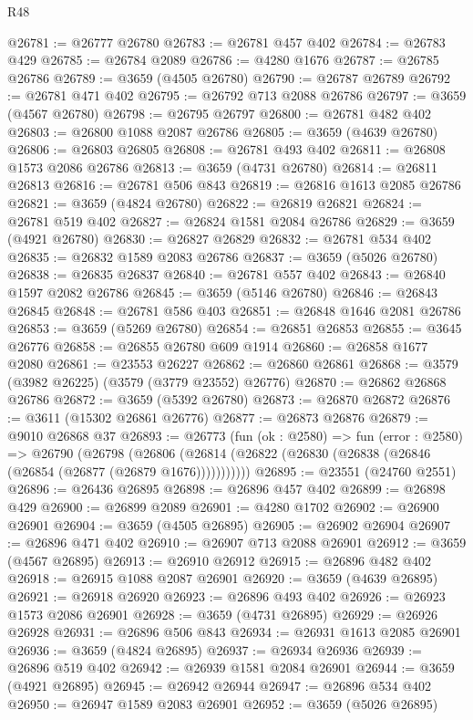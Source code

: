 \begin{lexlean}{R48}
\begin{coremodule}
@26781 := @26777 @26780
@26783 := @26781 @457 @402
@26784 := @26783 @429
@26785 := @26784 @2089
@26786 := @4280 @1676
@26787 := @26785 @26786
@26789 := @3659 (@4505 @26780)
@26790 := @26787 @26789
@26792 := @26781 @471 @402
@26795 := @26792 @713 @2088 @26786
@26797 := @3659 (@4567 @26780)
@26798 := @26795 @26797
@26800 := @26781 @482 @402
@26803 := @26800 @1088 @2087 @26786
@26805 := @3659 (@4639 @26780)
@26806 := @26803 @26805
@26808 := @26781 @493 @402
@26811 := @26808 @1573 @2086 @26786
@26813 := @3659 (@4731 @26780)
@26814 := @26811 @26813
@26816 := @26781 @506 @843
@26819 := @26816 @1613 @2085 @26786
@26821 := @3659 (@4824 @26780)
@26822 := @26819 @26821
@26824 := @26781 @519 @402
@26827 := @26824 @1581 @2084 @26786
@26829 := @3659 (@4921 @26780)
@26830 := @26827 @26829
@26832 := @26781 @534 @402
@26835 := @26832 @1589 @2083 @26786
@26837 := @3659 (@5026 @26780)
@26838 := @26835 @26837
@26840 := @26781 @557 @402
@26843 := @26840 @1597 @2082 @26786
@26845 := @3659 (@5146 @26780)
@26846 := @26843 @26845
@26848 := @26781 @586 @403
@26851 := @26848 @1646 @2081 @26786
@26853 := @3659 (@5269 @26780)
@26854 := @26851 @26853
@26855 := @3645 @26776
@26858 := @26855 @26780 @609 @1914
@26860 := @26858 @1677 @2080
@26861 := @23553 @26227
@26862 := @26860 @26861
@26868 := @3579 (@3982 @26225) (@3579 (@3779 @23552) @26776)
@26870 := @26862 @26868 @26786
@26872 := @3659 (@5392 @26780)
@26873 := @26870 @26872
@26876 := @3611 (@15302 @26861 @26776)
@26877 := @26873 @26876
@26879 := @9010 @26868 @37
@26893 := @26773
    (fun (ok : @2580) =>
    fun (error : @2580) =>
    @26790
      (@26798
        (@26806 (@26814 (@26822 (@26830 (@26838 (@26846 (@26854 (@26877 (@26879 @1676)))))))))))
@26895 := @23551 (@24760 @2551)
@26896 := @26436 @26895
@26898 := @26896 @457 @402
@26899 := @26898 @429
@26900 := @26899 @2089
@26901 := @4280 @1702
@26902 := @26900 @26901
@26904 := @3659 (@4505 @26895)
@26905 := @26902 @26904
@26907 := @26896 @471 @402
@26910 := @26907 @713 @2088 @26901
@26912 := @3659 (@4567 @26895)
@26913 := @26910 @26912
@26915 := @26896 @482 @402
@26918 := @26915 @1088 @2087 @26901
@26920 := @3659 (@4639 @26895)
@26921 := @26918 @26920
@26923 := @26896 @493 @402
@26926 := @26923 @1573 @2086 @26901
@26928 := @3659 (@4731 @26895)
@26929 := @26926 @26928
@26931 := @26896 @506 @843
@26934 := @26931 @1613 @2085 @26901
@26936 := @3659 (@4824 @26895)
@26937 := @26934 @26936
@26939 := @26896 @519 @402
@26942 := @26939 @1581 @2084 @26901
@26944 := @3659 (@4921 @26895)
@26945 := @26942 @26944
@26947 := @26896 @534 @402
@26950 := @26947 @1589 @2083 @26901
@26952 := @3659 (@5026 @26895)

\end{coremodule}
\end{lexlean}
